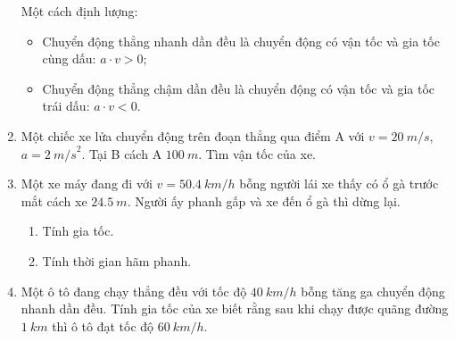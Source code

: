\begin{enumerate}[label=\bfseries Câu \arabic*:]
{		Một cách định lượng:
		\begin{itemize}
			\item Chuyển động thẳng nhanh dần đều là chuyển động có vận tốc và gia tốc cùng dấu: $a\cdot v >0$;
			\item Chuyển động thẳng chậm dần đều là chuyển động có vận tốc và gia tốc trái dấu: $a\cdot v <0$.
		\end{itemize}
	}
			\item {}
	
	{
		
		Một chiếc xe lửa chuyển động trên đoạn thẳng qua điểm A với $v = \SI{20}{m/s}$, $a = \SI{2}{m/s}^2$. Tại B cách A $\SI{100}{m}$. Tìm vận tốc của xe.
	}
	
	\item {}
	
	{
		
		Một xe máy đang đi với $v = \SI{50,4}{km/h}$ bỗng người lái xe thấy có ổ gà trước mắt cách xe $\SI{24,5}{m}$. Người ấy phanh gấp và xe đến ổ gà thì dừng lại.
		
		\begin{enumerate}[label=\alph*)]
			\item Tính gia tốc.
			\item Tính thời gian hãm phanh.
		\end{enumerate}
	}
	
	\item {}
	
	
	{Một ô tô đang chạy thẳng đều với tốc độ $\SI{40}{km/h}$ bỗng tăng ga chuyển động nhanh dần đều. Tính gia tốc của xe biết rằng sau khi chạy được quãng đường $\SI{1}{km}$ thì ô tô đạt tốc độ $\SI{60}{km/h}$.
	}
	

\end{enumerate}
